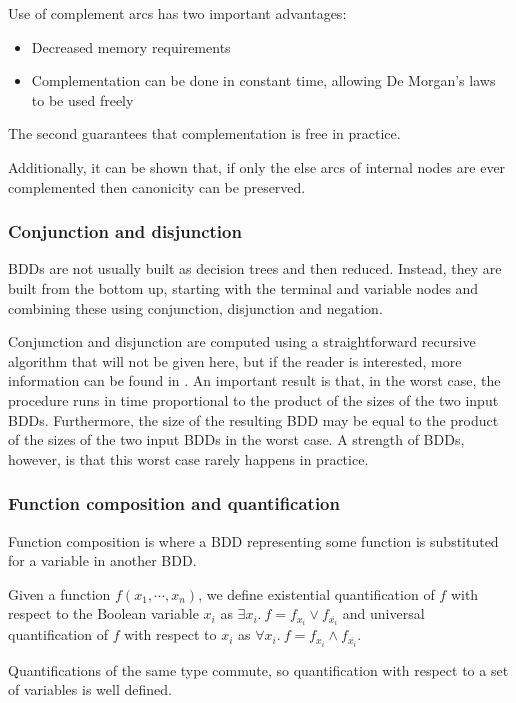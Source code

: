 Use of complement arcs has two important advantages:
\begin{itemize}
    \item Decreased memory requirements
    \item Complementation can be done in constant time, allowing De Morgan's laws to be used freely
\end{itemize}

The second guarantees that complementation is free in practice.

Additionally, it can be shown that, if only the else arcs of internal nodes are ever complemented then canonicity can be preserved.

\subsubsection{Conjunction and disjunction}

BDDs are not usually built as decision trees and then reduced. Instead, they are built from the bottom up, starting with the terminal and variable nodes and combining these using conjunction, disjunction and negation.

Conjunction and disjunction are computed using a straightforward recursive algorithm that will not be given here, but if the reader is interested, more information can be found in \cite{somenzi_bdd}. An important result is that, in the worst case, the procedure runs in time proportional to the product of the sizes of the two input BDDs. Furthermore, the size of the resulting BDD may be equal to the product of the sizes of the two input BDDs in the worst case. A strength of BDDs, however, is that this worst case rarely happens in practice. 

\subsubsection{Function composition and quantification}

Function composition is where a BDD representing some function is substituted for a variable in another BDD.

Given a function $f(x_1,\cdots,x_n)$, we define existential quantification of $f$ with respect to the Boolean variable $x_i$ as $\exists x_i.\ f = f_{x_i} \vee f_{\overline{x_i}}$ and universal quantification of $f$ with respect to $x_i$ as $\forall x_i.\ f = f_{x_i} \wedge f_{\overline{x_i}}$.

Quantifications of the same type commute, so quantification with respect to a set of variables is well defined. 

